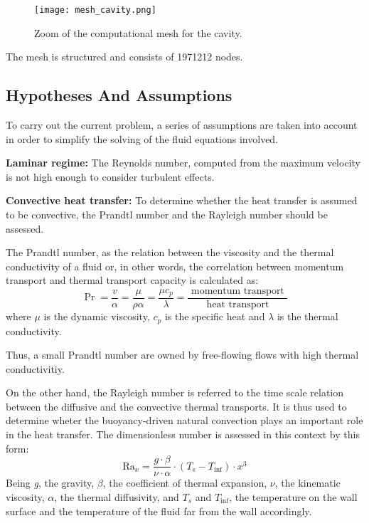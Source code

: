 \begin{figure}[h!]
	\centering
	\texttt{[image: mesh\_cavity.png]}	
	\caption{Zoom of the computational mesh for the cavity.}
	\label{3.2fig}
\end{figure} 
The mesh is structured and consists of 1971212 nodes.

\subsection{Hypotheses And Assumptions}

\setlength{\parindent}{0.5cm} To carry out the current problem, a series of assumptions are taken into account in order to simplify the solving of the fluid equations involved.

\textbf{Laminar regime:} The Reynolds number, computed from the maximum velocity is not high enough to consider turbulent effects. 

\textbf{Convective heat transfer:} To determine whether the heat transfer is assumed to be convective, the Prandtl number and the Rayleigh number should be assessed.

\noindent The Prandtl number, as the relation between the viscosity and the thermal conductivity of a fluid or, in other words, the correlation between momentum transport and thermal transport capacity is calculated as:
\begin{equation}
	\operatorname{Pr}=\frac{v}{\alpha}=\frac{\mu}{\rho \alpha}=\frac{\mu c_{p}}{\lambda}=\frac{\text { momentum transport }}{\text { heat transport }}
	\label{3.3}
\end{equation}
where $\mu$ is the dynamic viscosity, $c_{p}$ is the specific heat and $\lambda$ is the thermal conductivity.

\noindent Thus, a small Prandtl number are owned by free-flowing flows with high thermal conductivitiy.

\noindent On the other hand, the Rayleigh number is referred to the time scale relation between the diffusive and the convective thermal transports. It is thus used to determine wheter the buoyancy-driven natural convection plays an important role in the heat transfer. The dimensionless number is assessed in this context by this form:
\begin{equation}
	\mathrm{Ra}_{x}=\frac{g \cdot \beta}{\nu \cdot \alpha} \cdot\left(T_{s}-T_{\mathrm{inf}}\right) \cdot x^{3}
	\label{3.4}
\end{equation}
Being \textit{g}, the gravity, \textit{$\beta$}, the coefficient of thermal expansion, \textit{$\nu$}, the kinematic viscosity, \textit{$\alpha$}, the thermal diffusivity, and \textit{$T_{s}$} and \textit{$T_{\mathrm{inf}}$}, the temperature on the wall surface and the temperature of the fluid far from the wall accordingly.


